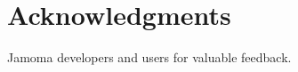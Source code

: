\documentclass{article}
\newenvironment{packed_item}{
\begin{itemize}
  \setlength{\itemsep}{1pt}
  \setlength{\parskip}{0pt}
  \setlength{\parsep}{0pt}
}{\end{itemize}}
\begin{document}
%
%	
%






\section{Acknowledgments} %

Jamoma developers and users for valuable feedback.

%

%
\end{document}
